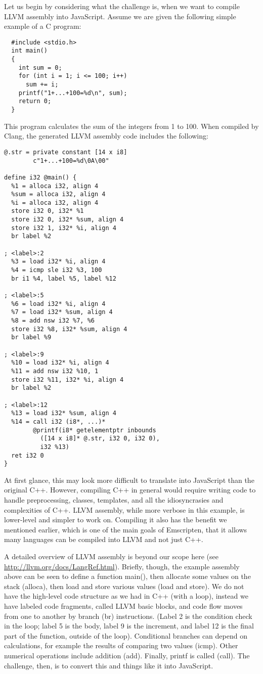 \documentclass[preprint,10pt]{sigplanconf}
\begin{document}
Let us begin by considering what the challenge is, when we want to compile LLVM assembly
into JavaScript. Assume we are given the
following simple example of a C program:
\begin{verbatim}
  #include <stdio.h>
  int main()
  {
    int sum = 0;
    for (int i = 1; i <= 100; i++)
      sum += i;
    printf("1+...+100=%d\n", sum);
    return 0;
  }
\end{verbatim}
This program calculates the sum of the integers from 1 to 100. When
compiled by Clang, the generated LLVM
assembly code includes the following:
\label{code:examplellvm}
\begin{verbatim}
@.str = private constant [14 x i8]
        c"1+...+100=%d\0A\00"

define i32 @main() {
  %1 = alloca i32, align 4
  %sum = alloca i32, align 4
  %i = alloca i32, align 4
  store i32 0, i32* %1
  store i32 0, i32* %sum, align 4
  store i32 1, i32* %i, align 4
  br label %2

; <label>:2
  %3 = load i32* %i, align 4
  %4 = icmp sle i32 %3, 100
  br i1 %4, label %5, label %12

; <label>:5
  %6 = load i32* %i, align 4
  %7 = load i32* %sum, align 4
  %8 = add nsw i32 %7, %6
  store i32 %8, i32* %sum, align 4
  br label %9

; <label>:9
  %10 = load i32* %i, align 4
  %11 = add nsw i32 %10, 1
  store i32 %11, i32* %i, align 4
  br label %2

; <label>:12
  %13 = load i32* %sum, align 4
  %14 = call i32 (i8*, ...)*
        @printf(i8* getelementptr inbounds
          ([14 x i8]* @.str, i32 0, i32 0),
          i32 %13)
  ret i32 0
}
\end{verbatim}
At first glance, this may look more difficult to translate into
JavaScript than the original C++. However, compiling C++ in
general would require writing code to handle preprocessing,
classes, templates, and all the idiosyncrasies and complexities
of C++. LLVM assembly, while more verbose in this example, is
lower-level and simpler to work on. Compiling it also has the benefit we
mentioned earlier, which
is one of the main goals of Emscripten, that it allows many languages can
be compiled into LLVM and not just C++.

A detailed overview of LLVM assembly is beyond our scope here (see \url{http://llvm.org/docs/LangRef.html}). Briefly,
though, the example assembly above can be seen to define a
function main(), then allocate some values on the stack (alloca),
then load and store various values (load and store). We do not have
the high-level code structure as we had in C++ (with a loop), instead
we have labeled code fragments, called LLVM basic blocks, and code flow moves
from one to another by branch (br) instructions. (Label 2 is the
condition check in the loop; label 5 is the body, label 9 is the
increment, and label 12 is the final part of the function, outside
of the loop).
Conditional branches
can depend on calculations, for example the results of comparing
two values (icmp). Other numerical operations include addition (add).
Finally, printf is called (call). The challenge, then, is to convert
this and things like it into JavaScript.
\end{document}
